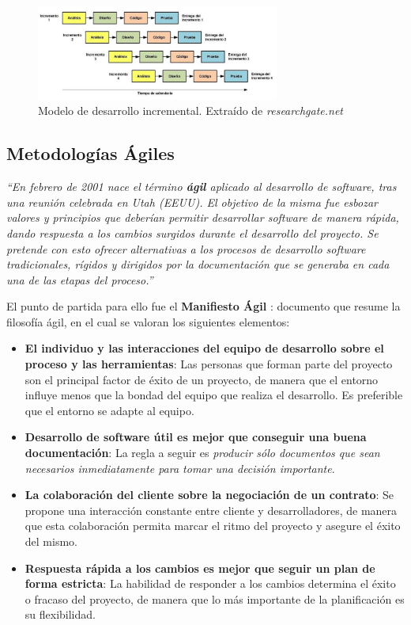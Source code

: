 \begin{itemize}
    \begin{figure}[H]
        \centering
        \includegraphics[width=8cm]{Figures/modelo_incremental.png}
        \caption{Modelo de desarrollo incremental. Extraído de \textit{researchgate.net} \autocite*{Alarcon2016}}
    \end{figure}
\end{itemize}

\subsection{Metodologías Ágiles}
\textit{“En febrero de 2001 nace el término \textbf{ágil} aplicado al desarrollo de software, tras una reunión celebrada en 
\textnormal{Utah (EEUU)}. El objetivo de la misma fue esbozar valores y principios que deberían permitir desarrollar 
software de manera rápida, dando respuesta a los cambios surgidos durante el desarrollo del proyecto. Se pretende 
con esto ofrecer alternativas a los procesos de desarrollo software tradicionales, rígidos y dirigidos por la documentación 
que se generaba en cada una de las etapas del proceso.”} \autocite*{AmayaBalaguera2015} \medskip

El punto de partida para ello fue el \textbf{Manifiesto Ágil} \autocite*{Beck2001}: 
documento que resume la filosofía ágil, en el cual se valoran los siguientes elementos:
\begin{itemize}
    \item \textbf{El individuo y las interacciones del equipo de desarrollo sobre el proceso y las herramientas}:
    Las personas que forman parte del proyecto son el principal factor de éxito de un proyecto, de manera que el entorno
    influye menos que la bondad del equipo que realiza el desarrollo. Es preferible que el entorno se adapte al equipo.

    \item \textbf{Desarrollo de software útil es mejor que conseguir una buena documentación}:
    La regla a seguir es \textit{producir sólo documentos que sean necesarios inmediatamente para tomar una 
    decisión importante}.

    \item \textbf{La colaboración del cliente sobre la negociación de un contrato}: Se propone una interacción 
    constante entre cliente y desarrolladores, de manera que esta colaboración permita marcar el ritmo del 
    proyecto y asegure el éxito del mismo.

    \item \textbf{Respuesta rápida a los cambios es mejor que seguir un plan de forma estricta}:
    La habilidad de responder a los cambios determina el éxito o fracaso del proyecto, de manera que lo
    más importante de la planificación es su flexibilidad.
\end{itemize} 

